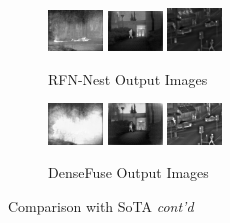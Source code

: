 \begin{figure}[htbp]
    \vspace{0.01cm}
    \begin{subfigure}[b]{\textwidth}
        \includegraphics[width=0.16\textwidth, height=0.1\textheight]{imgs/ch5/rfn/20.png}
        \includegraphics[width=0.16\textwidth, height=0.1\textheight]{imgs/ch5/rfn/12.png}
        \includegraphics[width=0.16\textwidth, height=0.1\textheight]{imgs/ch5/rfn/02.png}
        \captionsetup{justification=raggedright,singlelinecheck=false}
        \caption{RFN-Nest\cite{li2021rfn} Output Images}
        \label{fig:ch5:met9:rfn}
    \end{subfigure}
    \vspace{0.01cm}
    \begin{subfigure}[b]{\textwidth}
        \includegraphics[width=0.16\textwidth, height=0.1\textheight]{imgs/ch5/denseFuse/20.png}
        \includegraphics[width=0.16\textwidth, height=0.1\textheight]{imgs/ch5/denseFuse/12.png}
        \includegraphics[width=0.16\textwidth, height=0.1\textheight]{imgs/ch5/denseFuse/02.png}
        \captionsetup{justification=raggedright,singlelinecheck=false}
        \caption{DenseFuse\cite{li2019infrared} Output Images}
        \label{fig:ch5:met9:densefuse}
    \end{subfigure}
    \captionsetup{justification=raggedright,singlelinecheck=false}
        \caption{Comparison with SoTA \textit{cont'd}}
\end{figure}

